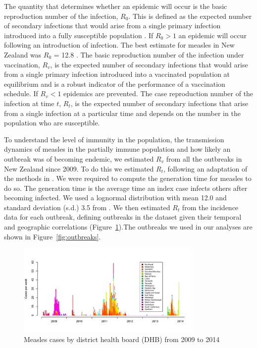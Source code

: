 \documentclass{article}
\begin{document}
{The quantity that determines whether an epidemic will occur is the basic reproduction number of the infection, $R_0$. This is defined as the expected number of secondary infections that would arise from a single primary infection introduced into a fully susceptible population \citep{anderson91, diekmann0}. If $R_0 > 1$ an epidemic will occur following an introduction of infection. The best estimate for measles in New Zealand was $R_0$ = 12.8 \citep{roberts4}. The basic reproduction number of the infection under vaccination, $R_v$, is the expected number of secondary infections that would arise from a single primary infection introduced into a vaccinated population at equilibrium and is a robust indicator of the performance of a vaccination schedule. If $R_v < 1$ epidemics are prevented. The case reproduction number of the infection at time $t$, $R_t$, is the expected number of secondary infections that arise from a single infection at a particular time and depends on the number in the population who are susceptible.

To understand the level of immunity in the population, the transmission dynamics of measles in the partially immune population and how likely an outbreak was of becoming endemic, we estimated $R_v$ from all the outbreaks in New Zealand since 2009. To do this we estimated $R_t$, following an adaptation of the methods in \citep{obidia12,wallinga4}. We were required to compute the generation time for measles to do so. The generation time is the average time an index case infects others after becoming infected. We used a lognormal distribution with mean 12.0 and standard deviation (s.d.) 3.5 from \citep{klinkenberg11}. We then estimated $R_t$ from the incidence data for each outbreak, defining outbreaks in the dataset given their temporal and geographic correlations (Figure~\ref{fig:dhbcases}).The outbreaks we used in our analyses are shown in Figure~\ref{fig:outbreaks}.

\begin{figure}
     \centering
     \includegraphics[width=0.8\textwidth]{cases_by_dhb_2009_2014.pdf}
     \caption{Measles cases by district health board (DHB) from 2009 to 2014}
     \label{fig:dhbcases}
\end{figure}

}
\end{document}

